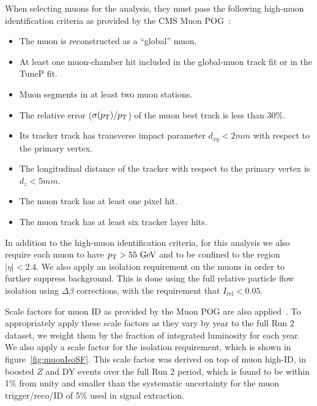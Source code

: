 When selecting muons for the analysis, they must pass the following high-\pt muon identification criteria as provided by the CMS Muon POG~\cite{MuonSelection}:
\begin{itemize}
  \item The muon is reconstructed as a ``global'' muon.
  \item At least one muon-chamber hit included in the global-muon track fit or in the TuneP fit.
  \item Muon segments in at least two muon stations.
  \item The \pt relative error ($\sigma(\pt)/\pt$) of the muon best track is less than 30\%.
  \item Its tracker track has transverse impact parameter $d_{xy}<2\unit{mm}$ with respect to the primary vertex.
  \item The longitudinal distance of the tracker with respect to the primary vertex is $d_z<5\unit{mm}$.
  \item The muon track has at least one pixel hit.
  \item The muon track has at least six tracker layer hits.
\end{itemize}

In addition to the high-\pt muon identification criteria, for this analysis we also require each muon to have $\pt>55\unit{GeV}$ and to be confined to the region $|\eta|<2.4$.
We also apply an isolation requirement on the muons in order to further suppress background.
This is done using the full relative particle flow isolation using $\Delta\beta$ corrections, with the requirement that $I_\mathrm{rel}<0.05$.

Scale factors for muon ID as provided by the Muon POG are also applied~\cite{MuonPAGs}.
To appropriately apply these scale factors as they vary by year to the full Run 2 dataset, we weight them by the fraction of integrated luminosity for each year.
We also apply a scale factor for the isolation requirement, which is shown in figure~\ref{fig:muonIsoSF}.
This scale factor was derived on top of muon high-\pt ID, in boosted $Z$ and DY events over the full Run 2 period, which is found to be within 1\% from unity and smaller than the systematic uncertainty for the muon trigger/reco/ID of 5\% used in signal extraction.

